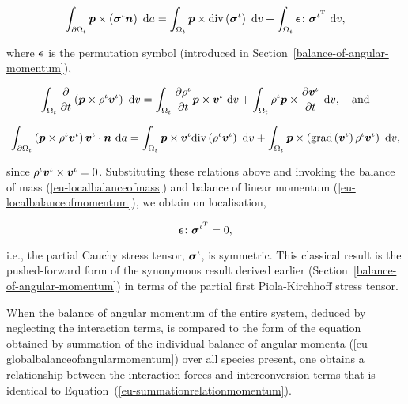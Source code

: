 \begin{displaymath}
\int_{\partial \Omega_{t}} \mbox{\boldmath$ p$} \times
\left(\mbox{\boldmath$\sigma$}^{\iota}\mbox{\boldmath$ n$}\right)\ \mathrm{d}a = \int_{\Omega_{t}}
\mbox{\boldmath$ p$} \times \mathrm{div}\left(\mbox{\boldmath$\sigma$}^{\iota}\right)\ \mathrm{d}v
+\int_{\Omega_{t}} \mbox{\boldmath$\epsilon$}\colon\mbox{\boldmath$\sigma$}^{\iota^{\mathrm{T}}}
\ \mathrm{d}v,
\end{displaymath}

\noindent where $\mbox{\boldmath$\epsilon$}$ is the permutation symbol (introduced in
Section~\ref{balance-of-angular-momentum}),

\begin{displaymath}
\int_{\Omega_{t}} \frac{\partial}{\partial t}\left( \mbox{\boldmath$ p$} \times
\rho^{\iota} \mbox{\boldmath$ v$}^{\iota}\right)\ \mathrm{d}v = \int_{\Omega_{t}}
\frac{\partial \rho^{\iota}} {\partial t} \mbox{\boldmath$ p$} \times
\mbox{\boldmath$ v$}^{\iota}\ \mathrm{d}v + \int_{\Omega_{t}} \rho^{\iota} \mbox{\boldmath$ p$} \times
\frac{\partial \mbox{\boldmath$ v$}^{\iota}} {\partial
  t}\ \mathrm{d}v,\quad\mathrm{and}
\end{displaymath}

\begin{displaymath}
\int_{\partial \Omega_{t}} \left(\mbox{\boldmath$ p$} \times \rho^{\iota}
\mbox{\boldmath$ v$}^{\iota}\right) \mbox{\boldmath$ v$}^{\iota} \cdot \mbox{\boldmath$ n$}\ \mathrm{d}a =
\int_{\Omega_{t}}\mbox{\boldmath$ p$} \times \mbox{\boldmath$ v$}^{\iota} \mathrm{div}
\left(\rho^{\iota}\mbox{\boldmath$ v$}^{\iota}\right)\ \mathrm{d}v +
\int_{\Omega_{t}}\mbox{\boldmath$ p$} \times
\left(\mathrm{grad}\left(\mbox{\boldmath$ v$}^{\iota}\right)
\rho^{\iota}\mbox{\boldmath$ v$}^{\iota}\right)\ \mathrm{d}v,
\end{displaymath}

\noindent since $\rho^{\iota} \mbox{\boldmath$ v$}^{\iota}\times\mbox{\boldmath$ v$}^{\iota} =
0$. Substituting these relations above and invoking the balance of
mass (\ref{eu-localbalanceofmass}) and balance of linear momentum
(\ref{eu-localbalanceofmomentum}), we obtain on localisation,

\begin{equation}
\mbox{\boldmath$\epsilon$}\colon\mbox{\boldmath$\sigma$}^{\iota^{\mathrm{T}}} = 0,
\label{eu-localbalanceofangularmomentum}
\end{equation}

\noindent i.e., the partial Cauchy stress tensor, $\mbox{\boldmath$\sigma$}^{\iota}$,
is symmetric. This classical result is the pushed-forward form of
the synonymous result derived earlier
(Section~\ref{balance-of-angular-momentum}) in terms of the partial
first Piola-Kirchhoff stress tensor.

When the balance of angular momentum of the entire system, deduced by
neglecting the interaction terms, is compared to the form of the
equation obtained by summation of the individual balance of angular
momenta (\ref{eu-globalbalanceofangularmomentum}) over all species
present, one obtains a relationship between the interaction forces and
interconversion terms that is identical to
Equation~(\ref{eu-summationrelationmomentum}).

